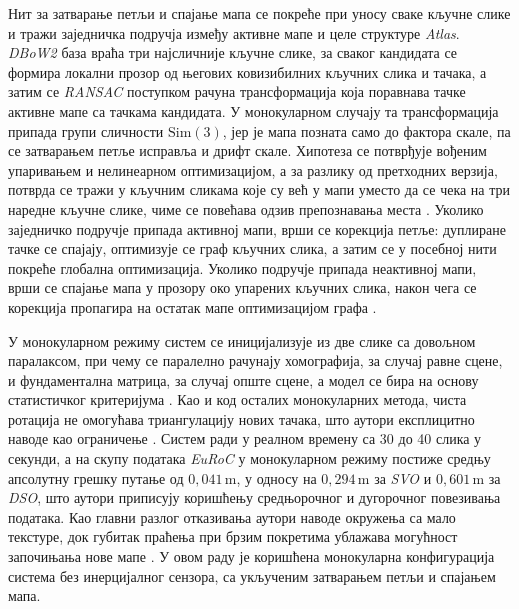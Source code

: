 \documentclass[12pt]{article}
\begin{document}
Нит за затварање петљи и спајање мапа се покреће при уносу сваке кључне слике и
тражи заједничка подручја између активне мапе и целе структуре \textit{Atlas}.
\textit{DBoW2} база враћа три најсличније кључне слике, за сваког кандидата се
формира локални прозор од његових ковизибилних кључних слика и тачака, а затим
се \textit{RANSAC} поступком рачуна трансформација која поравнава тачке
активне мапе са тачкама кандидата. У монокуларном случају та трансформација
припада групи сличности $\mathrm{Sim}(3)$, јер је мапа позната само до фактора
скале, па се затварањем петље исправља и дрифт скале. Хипотеза се потврђује
вођеним упаривањем и нелинеарном оптимизацијом, а за разлику од претходних
верзија, потврда се тражи у кључним сликама које су већ у мапи уместо да се
чека на три наредне кључне слике, чиме се повећава одзив препознавања места
\cite{campos2021orbslam3}. Уколико заједничко подручје припада активној мапи,
врши се корекција петље: дуплиране тачке се спајају, оптимизује се граф
кључних слика, а затим се у посебној нити покреће глобална оптимизација. Уколико
подручје припада неактивној мапи, врши се спајање мапа у прозору око упарених
кључних слика, након чега се корекција пропагира на остатак мапе оптимизацијом
графа \cite{campos2021orbslam3}.

У монокуларном режиму систем се иницијализује из две слике са довољном
паралаксом, при чему се паралелно рачунају хомографија, за случај равне сцене,
и фундаментална матрица, за случај опште сцене, а модел се бира на основу
статистичког критеријума \cite{murartal2015orbslam}. Као и код осталих
монокуларних метода, чиста ротација не омогућава триангулацију нових тачака,
што аутори експлицитно наводе као ограничење \cite{campos2021orbslam3}. Систем
ради у реалном времену са 30 до 40 слика у секунди, а на скупу података
\textit{EuRoC} у монокуларном режиму постиже средњу апсолутну грешку путање од
$0{,}041\,\mathrm{m}$, у односу на $0{,}294\,\mathrm{m}$ за \textit{SVO} и
$0{,}601\,\mathrm{m}$ за \textit{DSO}, што аутори приписују коришћењу
средњорочног и дугорочног повезивања података. Као главни разлог отказивања
аутори наводе окружења са мало текстуре, док губитак праћења при брзим
покретима ублажава могућност започињања нове мапе \cite{campos2021orbslam3}. У
овом раду је коришћена монокуларна конфигурација система без инерцијалног
сензора, са укљученим затварањем петљи и спајањем мапа.
\end{document}
